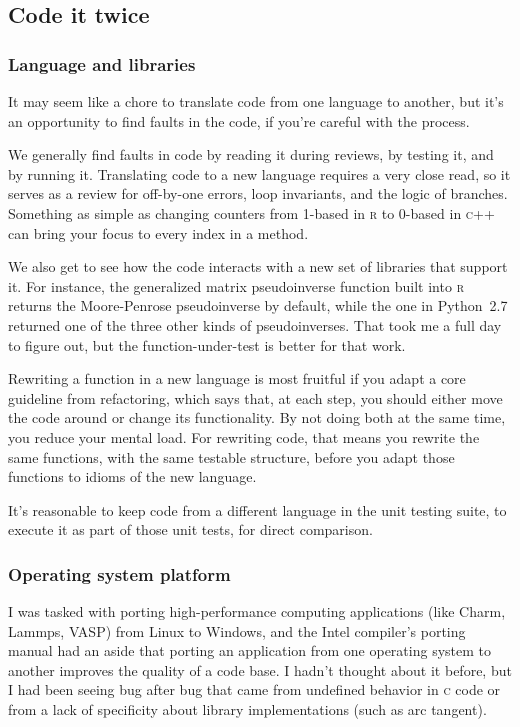 \documentclass[fleqn,10pt]{olplainarticle}
\newcommand{\rlang}{\textsc{r}\xspace}
\newcommand{\cpp}{\textsc{c}++\xspace}
\begin{document}
\subsection{Code it twice}

\subsubsection{Language and libraries}

It may seem like a chore to translate code from one language
to another, but it's an opportunity to find faults in the code,
if you're careful with the process.

We generally find faults in code by reading it during reviews, by testing
it, and by running it. Translating code to a new language requires
a very close read, so it serves as a review for off-by-one errors,
loop invariants, and the logic of branches. Something as simple
as changing counters from 1-based in \rlang to 0-based in \cpp
can bring your focus to every index in a method.

We also get to see how the code interacts with a new set of
libraries that support it. For instance, the generalized matrix pseudoinverse
function built into \rlang returns the Moore-Penrose pseudoinverse
by default, while the one in Python~2.7 returned one of the three
other kinds of pseudoinverses. That took me
a full day to figure out, but the function-under-test is better
for that work.

Rewriting a function in a new language is most fruitful
if you adapt a core guideline from refactoring, which says that,
at each step, you should either move the code around or change
its functionality. By not doing both at the same time, you reduce
your mental load. For rewriting code, that means you rewrite
the same functions, with the same testable structure, before
you adapt those functions to idioms of the new language.

It's reasonable to keep code from a different language in
the unit testing suite, to execute it as part of those unit
tests, for direct comparison.


\subsubsection{Operating system platform}

I was tasked with porting high-performance computing applications
(like Charm, Lammps, VASP) from Linux to Windows, and the Intel
compiler's porting manual had an aside that porting an application
from one operating system to another improves the quality of a code base.
I hadn't thought about it before, but I had been seeing bug
after bug that came from undefined behavior in \textsc{c} code or
from a lack of specificity about library implementations (such
as arc tangent).
\end{document}
